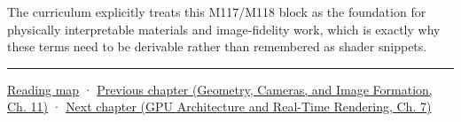 The curriculum explicitly treats this M117/M118 block as the foundation for physically interpretable materials and image-fidelity work, which is exactly why these terms need to be derivable rather than remembered as shader snippets.

\begin{center}\rule{0.5\linewidth}{0.5pt}\end{center}

\hyperref[volume-reading-map]{Reading map} · \href{../03-Geometry-Cameras-and-Image-Formation/main.pdf\#nameddest=03-visual-computing-i-ch004-sampling-filtering-and-reconstruction}{Previous chapter (Geometry, Cameras, and Image Formation, Ch. 11)} · \href{../06-GPU-Architecture-and-Real-Time-Rendering/main.pdf\#nameddest=03-visual-computing-i-ch006-from-material-data-to-gpu-bindings}{Next chapter (GPU Architecture and Real-Time Rendering, Ch. 7)}
